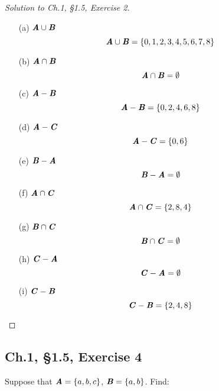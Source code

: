 \documentclass[12pt]{amsart}
\numberwithin{equation}{section}
\theoremstyle{definition}
\theoremstyle{remark}
\begin{document}
\begin{proof}[Solution to Ch.1, \S 1.5,  Exercise 2] \ \\

\begin{enumerate}
\item[(a)]
$ \textbf{\textit{A}} \cup \textbf{\textit{B}} $
$$
\textbf{\textit{A}} \cup \textbf{\textit{B}} = \{ 0, 1, 2, 3, 4, 5, 6, 7, 8 \}
$$

\item[(b)]
$ \textbf{\textit{A}} \cap \textbf{\textit{B}} $
$$
\textbf{\textit{A}} \cap \textbf{\textit{B}} = \emptyset
$$

\item[(c)]
$ \textbf{\textit{A}} - \textbf{\textit{B}} $
$$
\textbf{\textit{A}} - \textbf{\textit{B}} = \{ 0, 2, 4, 6, 8 \}
$$

\item[(d)]
$ \textbf{\textit{A}} - \textbf{\textit{C}} $
$$
\textbf{\textit{A}} - \textbf{\textit{C}} = \{ 0, 6 \}
$$

\item[(e)]
$ \textbf{\textit{B}} - \textbf{\textit{A}} $
$$
\textbf{\textit{B}} - \textbf{\textit{A}} = \emptyset
$$

\item[(f)]
$ \textbf{\textit{A}} \cap \textbf{\textit{C}} $
$$
\textbf{\textit{A}} \cap \textbf{\textit{C}} = \{ 2, 8, 4 \}
$$

\item[(g)]
$ \textbf{\textit{B}} \cap \textbf{\textit{C}} $
$$
\textbf{\textit{B}} \cap \textbf{\textit{C}} = \emptyset
$$

\item[(h)]
$ \textbf{\textit{C}} - \textbf{\textit{A}} $
$$
\textbf{\textit{C}} - \textbf{\textit{A}} = \emptyset
$$

\item[(i)]
$ \textbf{\textit{C}} - \textbf{\textit{B}} $
$$
\textbf{\textit{C}} - \textbf{\textit{B}} = \{ 2, 4, 8 \}
$$

\end{enumerate} 
\end{proof}




\subsection*{Ch.1, \S 1.5,  Exercise 4} Suppose that  $ \textbf{\textit{A}} = \{ a, b, c \} $, $ \textbf{\textit{B}} = \{ a, b \} $. Find:
\end{document}
